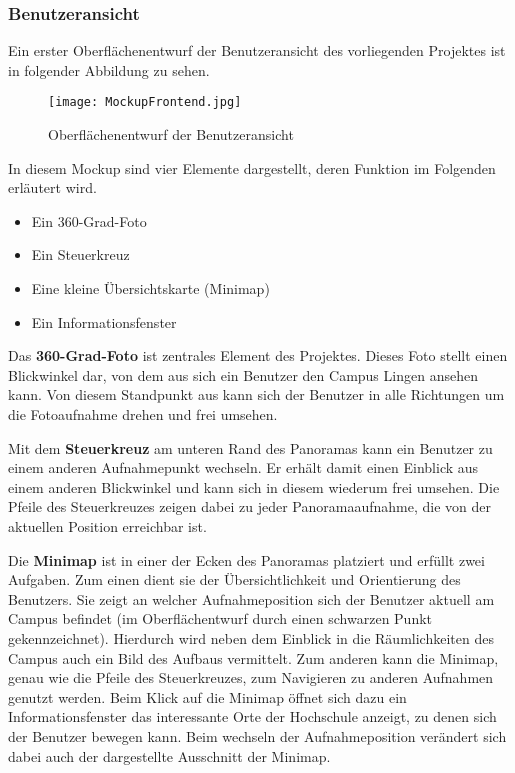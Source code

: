 \subsubsection{Benutzeransicht}
\label{sec:Benutzeransicht}

Ein erster Oberflächenentwurf der Benutzeransicht des vorliegenden Projektes ist in folgender Abbildung zu sehen.

\begin{figure}[htb]
\centering
\texttt{[image: MockupFrontend.jpg]}
\caption[Mockup Benutzeransicht]{Oberflächenentwurf der
Benutzeransicht\protect\footnotemark}
\label{fig:MockupFrontend}
\end{figure}

In diesem Mockup sind vier Elemente dargestellt, deren Funktion im Folgenden erläutert wird.

\begin{itemize}
 \item Ein 360-Grad-Foto
 \item Ein Steuerkreuz
 \item Eine kleine Übersichtskarte (Minimap)
 \item Ein Informationsfenster
\end{itemize}

Das \textbf{360-Grad-Foto} ist zentrales Element des Projektes. Dieses Foto stellt einen Blickwinkel dar, von dem aus sich ein Benutzer den Campus Lingen ansehen kann. Von diesem Standpunkt aus kann sich der Benutzer in alle Richtungen um die Fotoaufnahme drehen und frei umsehen.

Mit dem \textbf{Steuerkreuz} am unteren Rand des Panoramas kann ein Benutzer zu einem anderen Aufnahmepunkt wechseln. Er erhält damit einen Einblick aus einem anderen Blickwinkel und kann sich in diesem wiederum frei umsehen. Die Pfeile des Steuerkreuzes zeigen dabei zu jeder Panoramaaufnahme, die von der aktuellen Position erreichbar ist.

Die \textbf{Minimap} ist in einer der Ecken des Panoramas platziert und erfüllt zwei Aufgaben. Zum einen dient sie der Übersichtlichkeit und Orientierung des Benutzers. Sie zeigt an welcher Aufnahmeposition sich der Benutzer aktuell am Campus befindet (im Oberflächentwurf durch einen schwarzen Punkt gekennzeichnet). Hierdurch wird neben dem Einblick in die Räumlichkeiten des Campus auch ein Bild des Aufbaus vermittelt.
Zum anderen kann die Minimap, genau wie die Pfeile des Steuerkreuzes, zum Navigieren zu anderen Aufnahmen genutzt werden.
Beim Klick auf die Minimap öffnet sich dazu ein Informationsfenster das interessante Orte der Hochschule anzeigt, zu denen sich der Benutzer bewegen kann.
Beim wechseln der Aufnahmeposition verändert sich dabei auch der dargestellte Ausschnitt der Minimap.

